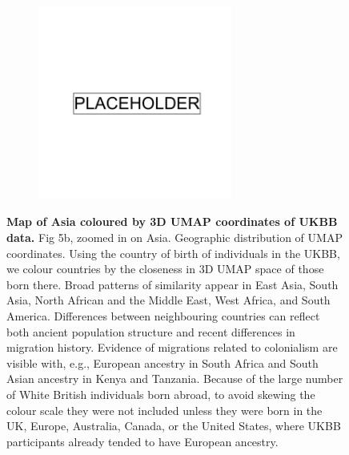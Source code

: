 \begin{figure}[ht]
    \centering
    \begin{subfigure}{\textwidth}
    \includegraphics[width=0.7\textwidth]{placeholder.png}
    \end{subfigure}
    \caption[Map of Asia coloured by 3D UMAP coordinates of UKBB data]{\textbf{Map of Asia coloured by 3D UMAP coordinates of UKBB data.} Fig 5b, zoomed in on Asia. Geographic distribution of UMAP coordinates. Using the country of birth of individuals in the UKBB, we colour countries by the closeness in 3D UMAP space of those born there. Broad patterns of similarity appear in East Asia, South Asia, North African and the Middle East, West Africa, and South America. Differences between neighbouring countries can reflect both ancient population structure and recent differences in migration history. Evidence of migrations related to colonialism are visible with, e.g., European ancestry in South Africa and South Asian ancestry in Kenya and Tanzania. Because of the large number of White British individuals born abroad, to avoid skewing the colour scale they were not included unless they were born in the UK, Europe, Australia, Canada, or the United States, where UKBB participants already tended to have European ancestry.}
    \label{fig:supp_umap_ukbb_asia}
\end{figure}

\newpage

